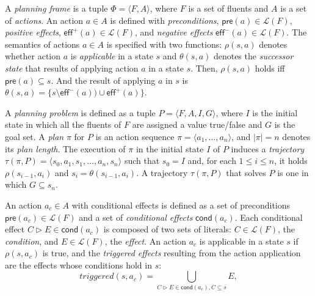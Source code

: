 \documentclass[letterpaper]{article} %
\newcommand{\tup}[1]{{\langle #1 \rangle}}
\newcommand{\pre}{\mathsf{pre}}     %
\newcommand{\eff}{\mathsf{eff}}     %
\newcommand{\cond}{\mathsf{cond}}   %
\begin{document}

A {\em planning frame} is a tuple $\Phi=\tup{F,A}$, where $F$ is a set of fluents and $A$ is a set of \emph{actions}. An action $a\in A$ is defined with {\em preconditions}, $\pre(a)\in\mathcal{L}(F)$, {\em positive effects}, $\eff^+(a)\in\mathcal{L}(F)$, and {\em negative effects} $\eff^-(a)\in\mathcal{L}(F)$. The semantics of actions $a\in A$ is specified with two functions: $\rho(s,a)$ denotes whether action $a$ is {\em applicable} in a state $s$ and $\theta(s,a)$ denotes the {\em successor state} that results of applying action $a$ in a state $s$. Then, $\rho(s,a)$ holds iff $\pre(a)\subseteq s$. And the result of applying $a$ in $s$ is $\theta(s,a)=\{s\setminus\eff^-(a))\cup\eff^+(a)\}$.

A {\em planning problem} is defined as a tuple $P=\tup{F,A,I,G}$, where $I$ is the initial state in which all the fluents of $F$ are assigned a value true/false and $G$ is the goal set. A {\em plan} $\pi$ for $P$ is an action sequence $\pi=\tup{a_1, \ldots, a_n}$, and $|\pi|=n$ denotes its {\em plan length}. The execution of $\pi$ in the initial state $I$ of $P$ induces a {\em trajectory} $\tau(\pi,P)=\tup{s_0, a_1, s_1, \ldots, a_n, s_n}$ such that $s_0=I$ and, for each {\small $1\leq i\leq n$}, it holds $\rho(s_{i-1},a_i)$ and $s_i=\theta(s_{i-1},a_i)$. A trajectory $\tau(\pi,P)$ that solves $P$ is one in which $G \subseteq s_n$.

An action $a_c\in A$ with conditional effects is defined as a set of preconditions $\pre(a_c)\in\mathcal{L}(F)$ and a set of {\em conditional effects} $\cond(a_c)$. Each conditional effect $C\rhd E\in\cond(a_c)$ is composed of two sets of literals: $C\in\mathcal{L}(F)$, the {\em condition}, and $E\in\mathcal{L}(F)$, the {\em effect}. An action $a_c$ is applicable in a state $s$ if $\rho(s,a_c)$ is true, and the {\em triggered effects} resulting from the action application are the effects whose conditions hold in $s$:
\[
triggered(s,a_c)=\bigcup_{C\rhd E\in\cond(a_c),C\subseteq s} E,
\]
\end{document}
